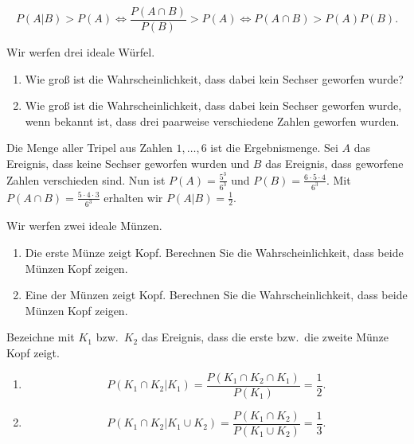 \solution
\begin{equation*}
    P(A|B)>P(A) \iff \frac{ P(A \cap B) }{ P(B)} > P(A) \iff P(A \cap B) > P(A)P(B).
\end{equation*}


 Wir werfen drei ideale Würfel. 
\begin{enumerate}
    \item Wie groß ist die Wahrscheinlichkeit, dass dabei kein Sechser geworfen wurde? 
    \item Wie groß ist die Wahrscheinlichkeit, dass dabei kein Sechser geworfen wurde, wenn
        bekannt ist, dass drei paarweise verschiedene Zahlen geworfen wurden. 
\end{enumerate}

\solution Die Menge aller Tripel aus Zahlen $1,\dots,6$ ist die Ergebnismenge.
Sei $A$ das Ereignis, dass keine Sechser geworfen wurden und $B$ das Ereignis,
dass geworfene Zahlen verschieden sind. Nun ist $P(A) = \frac{5^3}{6^3}$ und
$P(B)= \frac{6\cdot 5\cdot 4}{6^{3}}$. Mit $P(A \cap B) = \frac{5\cdot 4\cdot
3}{6^{3}}$ erhalten wir $P(A|B)=\frac{1}{2}$.


 Wir werfen zwei ideale Münzen.
\begin{enumerate}
    \item Die erste Münze zeigt Kopf. Berechnen Sie die Wahrscheinlichkeit,
        dass beide Münzen Kopf zeigen.

    \item Eine der Münzen zeigt Kopf. Berechnen Sie die Wahrscheinlichkeit,
        dass beide Münzen Kopf zeigen.
\end{enumerate}

\solution Bezeichne mit $K_1$ bzw.\ $K_2$ das Ereignis, dass die erste
bzw.\ die zweite Münze Kopf zeigt. 
\begin{enumerate}
    \item \begin{equation*}
            P( K_1 \cap K_2 | K_1 ) = \frac{ P( K_1 \cap K_2 \cap K_1) }{ P(K_1)} = \frac{1}{2}.
        \end{equation*}

    \item \begin{equation*}
            P( K_1 \cap K_2 | K_1 \cup K_2 ) = \frac{ P( K_1 \cap K_2) }{ P(K_1 \cup K_2) }
            = \frac{1}{3}. 
        \end{equation*}
\end{enumerate}


